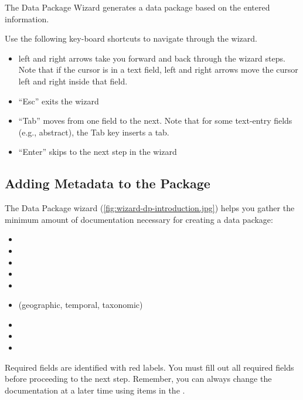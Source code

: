 The Data Package Wizard generates a data package based on the entered
information. 

Use the following key-board shortcuts to navigate through the wizard.
\begin{itemize}
  \setlength{\parskip}{1pt}
  \item left and right arrows take you forward and back through the
    wizard steps. Note that if the cursor is in a text field, left and
    right arrows move the cursor left and right inside that field.
  \item ``Esc'' exits the wizard
  \item ``Tab'' moves from one field to the next. Note that for some
    text-entry fields (e.g., abstract), the Tab key inserts a tab.
  \item ``Enter'' skips to the next step in the wizard
\end{itemize}

\subsection{Adding Metadata to the Package} \label{sec:adding-metadata}

The Data Package wizard (\autoref{fig:wizard-dp-introduction.jpg}) helps
you gather the minimum amount of documentation necessary for creating a
data package:
\begin{itemize}
  \setlength{\parskip}{1pt}
  \item {}
  \item {}
  \item {}
  \item {}
  \item {}
  \item {} (geographic, temporal,
    taxonomic)
  \item {}
  \item {}
  \item {}
\end{itemize}

Required fields are identified with red labels. You must fill out all
required fields before proceeding to the next step. Remember, you can
always change the documentation at a later time using items in the  
.

